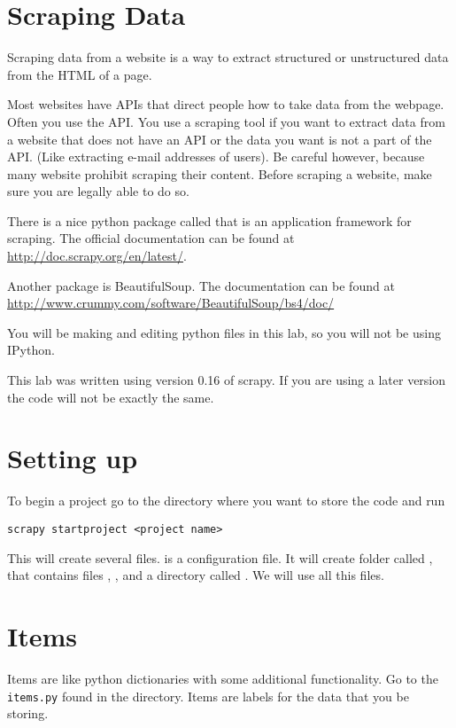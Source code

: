 
\section*{Scraping Data}
Scraping data from a website is a way to extract structured or unstructured data from the HTML of a page.

Most websites have APIs that direct people how to take data from the webpage. Often you use the API. You use a scraping tool if you want to extract data from a website that does not have an API or the data you want is not a part of the API. (Like extracting e-mail addresses of users).  Be careful however, because many website prohibit scraping their content.  Before scraping a website, make sure you are legally able to do so.

There is a nice python package called  that is an application framework for scraping.  The official documentation can be found at \url{http://doc.scrapy.org/en/latest/}. 

Another package is BeautifulSoup.  The documentation can be found at \url{http://www.crummy.com/software/BeautifulSoup/bs4/doc/}

\begin{info}
You will be making and editing python files in this lab, so you will not be using IPython.
\end{info}

\begin{warn}
This lab was written using version 0.16 of scrapy. If you are using a later version the code will not be exactly the same.
\end{warn}

\section*{Setting up}

To begin a project go to the directory where you want to store the code and run
\begin{lstlisting}
scrapy startproject <project name>
\end{lstlisting}
This will create several files.  is a configuration file. It will create folder called  , that contains files , ,  and a directory called . We will use all this files.

\section*{Items}
Items are like python dictionaries with some additional functionality. Go to the \texttt{items.py} found in the   directory. Items are labels for the data that you be storing.

